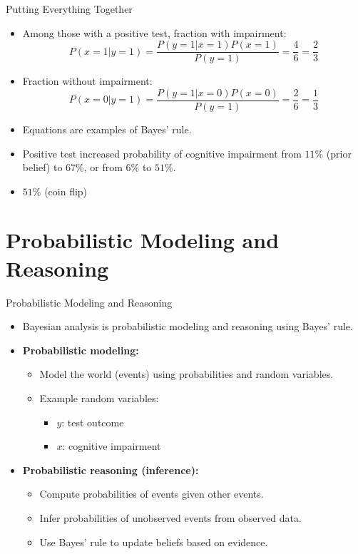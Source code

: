 \documentclass{beamer}
\begin{document}
\begin{frame}{Putting Everything Together}
\begin{itemize}
  \item Among those with a positive test, fraction with impairment:
  \[
  P(x = 1|y = 1) = \frac{P(y = 1|x = 1)P(x = 1)}{P(y = 1)} = \frac{4}{6} = \frac{2}{3}
  \]
  \item Fraction without impairment:
  \[
  P(x = 0|y = 1) = \frac{P(y = 1|x = 0)P(x = 0)}{P(y = 1)} = \frac{2}{6} = \frac{1}{3}
  \]
  \item Equations are examples of Bayes' rule.
  \item Positive test increased probability of cognitive impairment from $11\%$ (prior belief) to $67\%$, or from $6\%$ to $51\%$.
  \item $51\%$ (coin flip)
\end{itemize}
\end{frame}

\section{Probabilistic Modeling and Reasoning}

\begin{frame}{Probabilistic Modeling and Reasoning}
  \begin{itemize}
  \item Bayesian analysis is probabilistic modeling and reasoning using Bayes' rule.
  \item \textbf{Probabilistic modeling:}
    \begin{itemize}
      \item Model the world (events) using probabilities and random variables.
      \item Example random variables:
        \begin{itemize}
          \item $y$: test outcome
          \item $x$: cognitive impairment
        \end{itemize}
    \end{itemize}
  \item \textbf{Probabilistic reasoning (inference):}
    \begin{itemize}
      \item Compute probabilities of events given other events.
      \item Infer probabilities of unobserved events from observed data.
      \item Use \alert{Bayes' rule} to update beliefs based on evidence.
    \end{itemize}
\end{itemize}
\end{frame}
\end{document}

